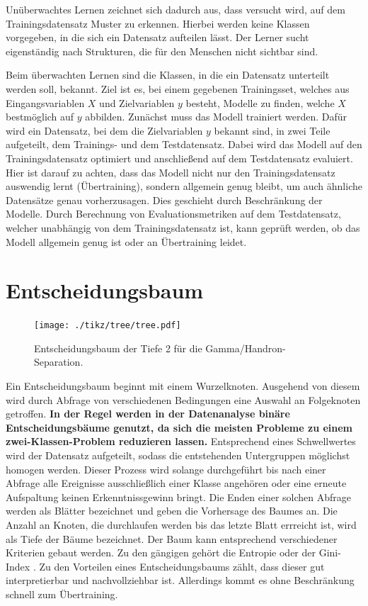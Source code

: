 Unüberwachtes Lernen zeichnet sich dadurch aus, dass versucht wird, auf dem Trainingsdatensatz Muster zu erkennen. 
Hierbei werden keine Klassen vorgegeben, in die sich ein Datensatz aufteilen lässt. 
Der Lerner sucht eigenständig nach Strukturen, die für den Menschen nicht sichtbar sind.

Beim überwachten Lernen sind die Klassen, in die ein Datensatz unterteilt werden soll, bekannt.
Ziel ist es, bei einem gegebenen Trainingsset, welches aus Eingangsvariablen $X$ und Zielvariablen $y$ besteht, Modelle zu finden, welche $X$ bestmöglich auf $y$ abbilden. 
Zunächst muss das Modell trainiert werden. 
Dafür wird ein Datensatz, bei dem die Zielvariablen $y$ bekannt sind, in zwei Teile aufgeteilt, dem Trainings- und dem Testdatensatz. 
Dabei wird das Modell auf den Trainingsdatensatz optimiert und anschließend auf dem Testdatensatz evaluiert. 
Hier ist darauf zu achten, dass das Modell nicht nur den Trainingsdatensatz auswendig lernt (Übertraining), sondern allgemein genug bleibt, um auch ähnliche Datensätze genau vorherzusagen. 
Dies geschieht durch Beschränkung der Modelle. 
Durch Berechnung von Evaluationsmetriken auf dem Testdatensatz, welcher unabhängig von dem Trainingsdatensatz ist, kann geprüft werden, ob das Modell allgemein genug ist oder an Übertraining leidet.
\section{Entscheidungsbaum}
\begin{figure}
  \centering
  \texttt{[image: ./tikz/tree/tree.pdf]}
  \caption{Entscheidungsbaum der Tiefe 2 für die Gamma/Handron-Separation.}
\end{figure}
Ein Entscheidungsbaum beginnt mit einem Wurzelknoten. Ausgehend von diesem wird durch Abfrage von verschiedenen Bedingungen eine Auswahl an Folgeknoten getroffen. 
\textbf{In der Regel werden in der Datenanalyse binäre Entscheidungsbäume genutzt, da sich die meisten Probleme zu einem zwei-Klassen-Problem reduzieren lassen.}
Entsprechend eines Schwellwertes wird der Datensatz aufgeteilt, sodass die entstehenden Untergruppen möglichst homogen werden. 
Dieser Prozess wird solange durchgeführt bis nach einer Abfrage alle Ereignisse ausschließlich einer Klasse angehören oder eine erneute Aufspaltung keinen Erkenntnissgewinn bringt. Die Enden einer solchen Abfrage werden als Blätter bezeichnet und geben die Vorhersage des Baumes an.
Die Anzahl an Knoten, die durchlaufen werden bis das letzte Blatt errreicht ist, wird als Tiefe der Bäume bezeichnet.
Der Baum kann entsprechend verschiedener Kriterien gebaut werden.
Zu den gängigen gehört die Entropie oder der Gini-Index \cite{model}. 
Zu den Vorteilen eines Entscheidungsbaums zählt, dass dieser gut interpretierbar und nachvollziehbar ist. 
Allerdings kommt es ohne Beschränkung schnell zum Übertraining.
